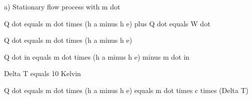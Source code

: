 a) Stationary flow process with m dot

Q dot equals m dot times (h a minus h e) plus Q dot equals W dot

Q dot equals m dot times (h a minus h e)

Q dot in equals m dot times (h a minus h e) minus m dot in

Delta T equals 10 Kelvin

Q dot equals m dot times (h a minus h e) equals m dot times c times (Delta T)